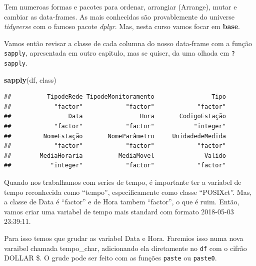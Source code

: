 \documentclass[]{book}
\newenvironment{Shaded}{\begin{snugshade}}{\end{snugshade}}
\newcommand{\KeywordTok}[1]{\textcolor[rgb]{0.13,0.29,0.53}{\textbf{#1}}}
\newcommand{\StringTok}[1]{\textcolor[rgb]{0.31,0.60,0.02}{#1}}
\newcommand{\OperatorTok}[1]{\textcolor[rgb]{0.81,0.36,0.00}{\textbf{#1}}}
\newcommand{\NormalTok}[1]{#1}
\begin{document}
Tem numeroas formas e pacotes para ordenar, arrangiar (Arrange), mutar e
cambiar as data-frames. As mais conhecidas são provablemente do universe
\emph{tidyverse} com o famoso pacote \emph{dplyr}. Mas, nesta curso
vamos focar em \textbf{base}.

Vamos então revisar a classe de cada columna do nosso data-frame com a
função \texttt{sapply}, apresentada em outro capitulo, mas se quiser, da
uma olhada em \texttt{?sapply}.

\begin{Shaded}
\begin{Highlighting}[]
\KeywordTok{sapply}\NormalTok{(df, class)}
\end{Highlighting}
\end{Shaded}

\begin{verbatim}
##          TipodeRede TipodeMonitoramento                Tipo 
##            "factor"            "factor"            "factor" 
##                Data                Hora       CodigoEstação 
##            "factor"            "factor"           "integer" 
##         NomeEstação       NomeParâmetro     UnidadedeMedida 
##            "factor"            "factor"            "factor" 
##        MediaHoraria          MediaMovel              Valido 
##           "integer"            "factor"            "factor"
\end{verbatim}

Quando nos trabalhamos com series de tempo, é importante ter a variabel
de tempo reconhecida como ``tempo'', especificamente como classe
``POSIXct''. Mas, a classe de Data é ``factor'' e de Hora tambem
``factor'', o que é ruim. Então, vamos criar uma variabel de tempo mais
standard com formato 2018-05-03 23:39:11.

Para isso temos que grudar as variabel Data e Hora. Faremios isso numa
nova varaibel chamada tempo\_char, adicionando ela diretamente no
\texttt{df} com o cifrão DOLLAR \$. O grude pode ser feito com as
funções \texttt{paste} ou \texttt{paste0}.

\begin{Shaded}
\end{Shaded}
\end{document}
